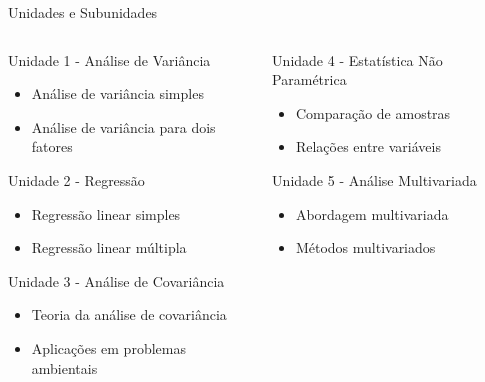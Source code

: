 \documentclass{bredelebeamer}
\begin{document}
\begin{frame}{Unidades e Subunidades}

\begin{columns}

\begin{column}{0.5\textwidth}
\begin{block}{Unidade 1 - Análise de Variância}
\begin{itemize}
\item Análise de variância simples
\item Análise de variância para dois fatores 
\end{itemize}
\end{block}

\begin{block}{Unidade 2 - Regressão}
\begin{itemize}
\item Regressão linear simples
\item Regressão linear múltipla
\end{itemize}
\end{block}

\begin{block}{Unidade 3 - Análise de Covariância}
\begin{itemize}
\item Teoria da análise de covariância
\item Aplicações em problemas ambientais
\end{itemize}
\end{block}
\end{column}

\begin{column}{0.5\textwidth}
\begin{block}{Unidade 4 - Estatística Não Paramétrica}
\begin{itemize}
\item Comparação de amostras
\item Relações entre variáveis
\end{itemize}
\end{block}

\begin{block}{Unidade 5 - Análise Multivariada}
\begin{itemize}
\item Abordagem multivariada
\item Métodos multivariados
\end{itemize}
\end{block}
\end{column}

\end{columns}
\end{frame}
\end{document}
